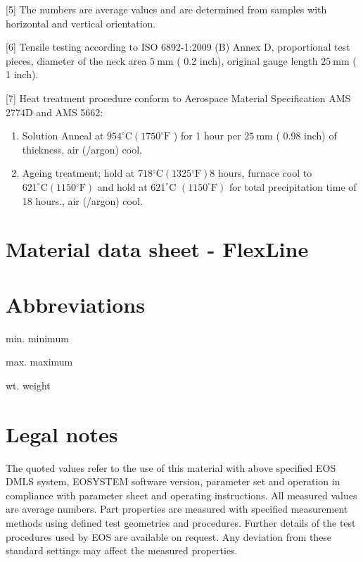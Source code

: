 \documentclass[10pt]{article}
\begin{document}
[5] The numbers are average values and are determined from samples with horizontal and vertical orientation.

[6] Tensile testing according to ISO 6892-1:2009 (B) Annex D, proportional test pieces, diameter of the neck area $5 \mathrm{~mm}$ ( 0.2 inch), original gauge length $25 \mathrm{~mm}$ ( 1 inch).

[7] Heat treatment procedure conform to Aerospace Material Specification AMS 2774D and AMS 5662:

\begin{enumerate}
  \item Solution Anneal at $954^{\circ} \mathrm{C}\left(1750^{\circ} \mathrm{F}\right.$ ) for 1 hour per $25 \mathrm{~mm}$ ( 0.98 inch) of thickness, air (/argon) cool.

  \item Ageing treatment; hold at $718{ }^{\circ} \mathrm{C}\left(1325{ }^{\circ} \mathrm{F}\right) 8$ hours, furnace cool to $621^{\circ} \mathrm{C}\left(1150{ }^{\circ} \mathrm{F}\right)$ and hold at $621^{\circ} \mathrm{C}$ $\left(1150^{\circ} \mathrm{F}\right)$ for total precipitation time of 18 hours., air (/argon) cool.

\end{enumerate}

\section*{Material data sheet - FlexLine}
\section*{Abbreviations}
min. minimum

max. maximum

wt. weight

\section*{Legal notes}
The quoted values refer to the use of this material with above specified EOS DMLS system, EOSYSTEM software version, parameter set and operation in compliance with parameter sheet and operating instructions. All measured values are average numbers. Part properties are measured with specified measurement methods using defined test geometries and procedures. Further details of the test procedures used by EOS are available on request. Any deviation from these standard settings may affect the measured properties.
\end{document}
